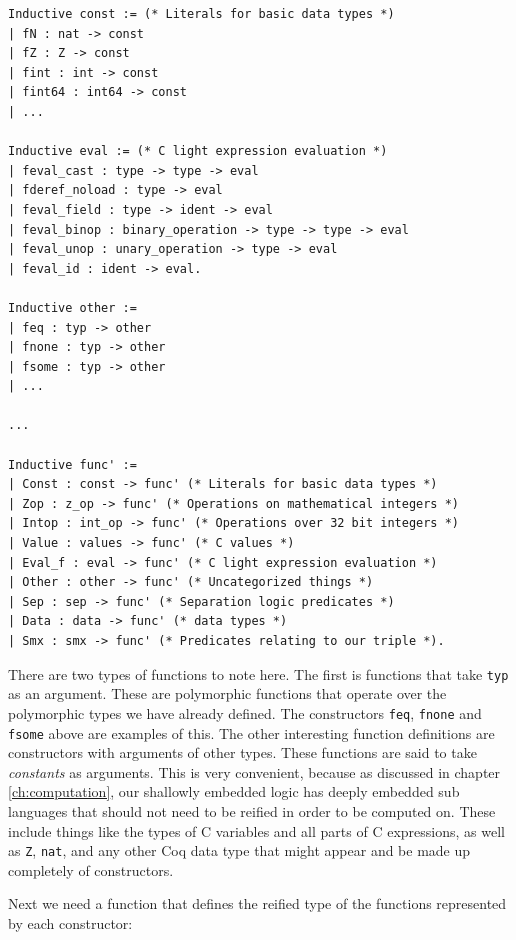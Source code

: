 \documentclass{puthesis}
\begin{document}
\begin{lstlisting}
Inductive const := (* Literals for basic data types *)
| fN : nat -> const
| fZ : Z -> const
| fint : int -> const
| fint64 : int64 -> const
| ...

Inductive eval := (* C light expression evaluation *)
| feval_cast : type -> type -> eval
| fderef_noload : type -> eval
| feval_field : type -> ident -> eval
| feval_binop : binary_operation -> type -> type -> eval
| feval_unop : unary_operation -> type -> eval
| feval_id : ident -> eval.

Inductive other := 
| feq : typ -> other
| fnone : typ -> other
| fsome : typ -> other
| ...

...

Inductive func' :=
| Const : const -> func' (* Literals for basic data types *)
| Zop : z_op -> func' (* Operations on mathematical integers *)
| Intop : int_op -> func' (* Operations over 32 bit integers *)
| Value : values -> func' (* C values *)
| Eval_f : eval -> func' (* C light expression evaluation *)
| Other : other -> func' (* Uncategorized things *)
| Sep : sep -> func' (* Separation logic predicates *)
| Data : data -> func' (* data types *)
| Smx : smx -> func' (* Predicates relating to our triple *).

\end{lstlisting}

There are two types of functions to note here. The first is functions
that take \lstinline|typ| as an argument. These are polymorphic
functions that operate over the polymorphic types we have
already defined. The constructors \lstinline|feq|, \lstinline|fnone|
and \lstinline|fsome| above are examples of this. The other
interesting function definitions are constructors with arguments of
other types. These functions are said to take \emph{constants} as
arguments. This is very convenient, because as discussed in chapter
\ref{ch:computation}, our shallowly embedded logic has deeply embedded
sub languages that should not need to be reified
in order to be computed on. These include things like the types of C
variables and all parts of C expressions, as well as \lstinline|Z|,
\lstinline|nat|, and any other Coq data type that might appear and be
made up completely of constructors.

Next we need a function that defines the reified type of the functions
represented by each constructor:
\end{document}
